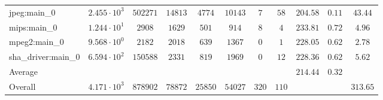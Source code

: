 \begin{tabular}{|l|c|c|c|c|c|c|c|c|c|c|}
jpeg:main\_0            & $ 2.455 \cdot 10^{3}  $ & $ 502271 $ & $ 14813 $ & $ 4774  $ & $ 10143 $ & $ 7   $ & $ 58  $ & $ 204.58      $ & $ 0.11    $ & $ 43.44   $ \\
mips:main\_0            & $ 1.244 \cdot 10^{1}  $ & $ 2908   $ & $ 1629  $ & $ 501   $ & $ 914   $ & $ 8   $ & $ 4   $ & $ 233.81      $ & $ 0.72    $ & $ 4.96    $ \\
mpeg2:main\_0           & $ 9.568 \cdot 10^{0}  $ & $ 2182   $ & $ 2018  $ & $ 639   $ & $ 1367  $ & $ 0   $ & $ 1   $ & $ 228.05      $ & $ 0.62    $ & $ 2.78    $ \\
sha\_driver:main\_0     & $ 6.594 \cdot 10^{2}  $ & $ 150588 $ & $ 2331  $ & $ 819   $ & $ 1969  $ & $ 0   $ & $ 12  $ & $ 228.36      $ & $ 0.62    $ & $ 5.62    $ \\
\hline
Average                 & $                     $ & $        $ & $       $ & $       $ & $       $ & $     $ & $     $ & $ 214.44      $ & $ 0.32    $ & $         $ \\
\hline
Overall                 & $ 4.171 \cdot 10^{3}  $ & $ 878902 $ & $ 78872 $ & $ 25850 $ & $ 54027 $ & $ 320 $ & $ 110 $ & $             $ & $         $ & $ 313.65  $ \\
\hline
\end{tabular}
